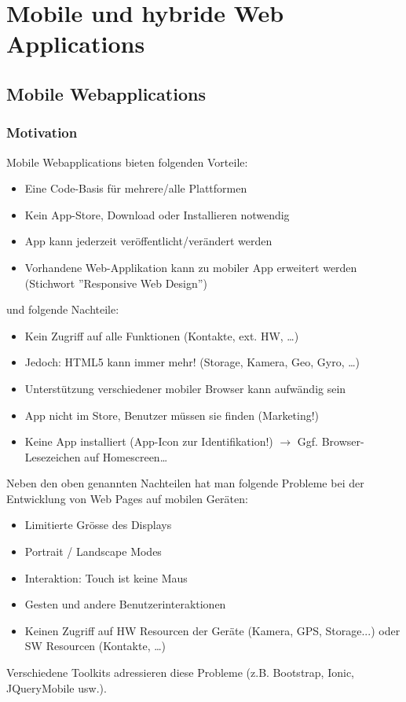 \chapter{Mobile und hybride Web Applications}

\section{Mobile Webapplications}

\subsection{Motivation}

Mobile Webapplications bieten folgenden Vorteile:
\begin{itemize}
	\item Eine Code-Basis für mehrere/alle Plattformen
	\item Kein App-Store, Download oder Installieren notwendig
	\item App kann jederzeit veröffentlicht/verändert werden
	\item Vorhandene Web-Applikation kann zu mobiler App erweitert werden (Stichwort ''Responsive Web Design'')
\end{itemize}
und folgende Nachteile:
\begin{itemize}
	\item Kein Zugriff auf alle Funktionen (Kontakte, ext. HW, \dots)
	\item Jedoch: HTML5 kann immer mehr! (Storage, Kamera, Geo, Gyro, \dots)
	\item Unterstützung verschiedener mobiler Browser kann aufwändig sein
	\item App nicht im Store, Benutzer müssen sie finden (Marketing!)
	\item Keine App installiert (App-Icon zur Identifikation!) $\rightarrow$ Ggf. Browser-Lesezeichen auf Homescreen\dots
\end{itemize}
Neben den oben genannten Nachteilen hat man folgende Probleme bei der Entwicklung von Web Pages auf mobilen Geräten:
\begin{itemize}
	\item Limitierte Grösse des Displays
	\item Portrait / Landscape Modes
	\item Interaktion: Touch ist keine Maus
	\item Gesten und andere Benutzerinteraktionen
	\item Keinen Zugriff auf HW Resourcen der Geräte (Kamera, GPS, Storage...) oder SW Resourcen (Kontakte, \dots)
\end{itemize}
Verschiedene Toolkits adressieren diese Probleme (z.B. Bootstrap, Ionic, JQueryMobile usw.).

